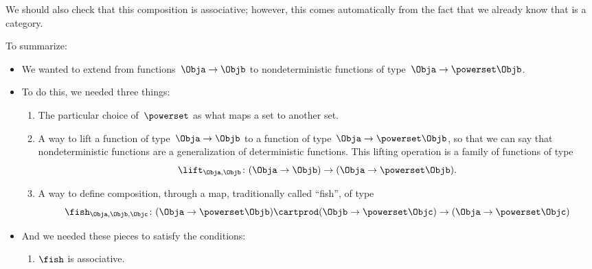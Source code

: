 \begin{figure}[h]
    \caption{}
    \label{fig:mapping-nondeterministic}
\end{figure}

We should also check that this composition is associative; however, this comes automatically from the fact that we already know that \Rel is a category.

To summarize:
\begin{itemize}
    \item We wanted to extend \Set from functions~$\Obja \to \Objb$ to nondeterministic functions of type~$\Obja \to \powerset\Objb$.
    \item To do this, we needed three things:
          \begin{enumerate}
              \item The particular choice of~$\powerset$ as what maps a set to another set.
              \item A way to lift a function of type~$\Obja \to \Objb$ to a function of type~$\Obja \to \powerset\Objb$, so that we can say that nondeterministic functions are a generalization of deterministic functions.
                    This lifting operation is a family of functions of type
                    \begin{equation}
                        \label{eq:monad-lift}
                        \lift_{\Obja, \Objb}\colon (\Obja \to \Objb) \to (\Obja \to \powerset\Objb).
                    \end{equation}
              \item A way to define composition, through a map, traditionally called ``fish'', of type
                    \begin{equation}
                        \label{eq:monad-fish}
                        \fish_{\Obja, \Objb, \Objc}\colon (\Obja \to \powerset\Objb) \cartprod (\Objb \to \powerset\Objc)
                        \to (\Obja \to \powerset \Objc)
                    \end{equation}
          \end{enumerate}
    \item And we needed these pieces to satisfy the conditions:
          \begin{enumerate}
              \item $\fish$ is associative.

\end{enumerate}
\end{itemize}

